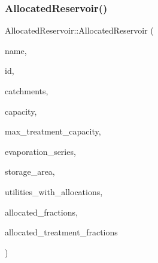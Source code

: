 \subsubsection{\texorpdfstring{Allocated\+Reservoir()}{AllocatedReservoir()}\hspace{0.1cm}{\footnotesize\ttfamily [3/5]}}
{\footnotesize\ttfamily Allocated\+Reservoir\+::\+Allocated\+Reservoir (\begin{DoxyParamCaption}\item[{const char $\ast$}]{name,  }\item[{const int}]{id,  }\item[{const vector$<$ \mbox{\hyperlink{classCatchment}{Catchment}} $\ast$$>$ \&}]{catchments,  }\item[{const double}]{capacity,  }\item[{const double}]{max\+\_\+treatment\+\_\+capacity,  }\item[{\mbox{\hyperlink{classEvaporationSeries}{Evaporation\+Series}} \&}]{evaporation\+\_\+series,  }\item[{double}]{storage\+\_\+area,  }\item[{vector$<$ int $>$ $\ast$}]{utilities\+\_\+with\+\_\+allocations,  }\item[{vector$<$ double $>$ $\ast$}]{allocated\+\_\+fractions,  }\item[{vector$<$ double $>$ $\ast$}]{allocated\+\_\+treatment\+\_\+fractions }\end{DoxyParamCaption})}

\mbox{\label{classAllocatedReservoir_a44ac982717a21a0b24bb3019d07ffe89_a44ac982717a21a0b24bb3019d07ffe89}} 
